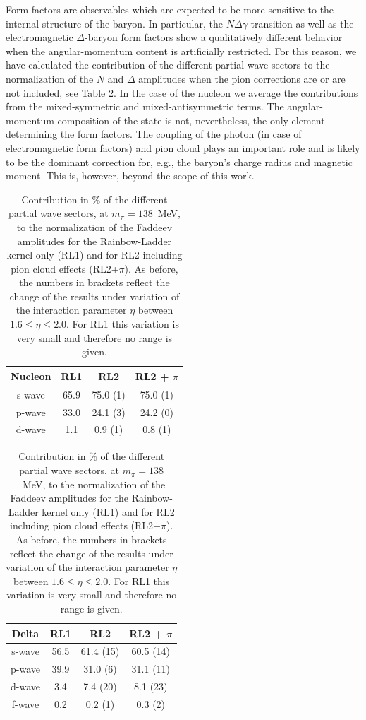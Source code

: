 Form factors are observables which are expected to be more sensitive to the internal structure of the baryon. In particular, the $N\Delta\gamma$ transition \cite{Eichmann:2011aa} as well as the electromagnetic $\Delta$-baryon form factors \cite{Sanchis-Alepuz:2013iia} show a qualitatively different behavior when the angular-momentum content is artificially restricted. For this reason, we have calculated the contribution of the different partial-wave sectors to the normalization of the $N$ and $\Delta$ amplitudes when the pion corrections are or are not included, see Table \ref{tab:PartialWaveContributions}. In the case of the nucleon we average the contributions from the mixed-symmetric and mixed-antisymmetric terms. The angular-momentum composition of the state is not, nevertheless, the only element determining the form factors. The coupling of the photon (in case of electromagnetic form factors) and pion cloud plays an important role and is likely to be the dominant correction for, e.g., the baryon's charge radius and magnetic moment. This is, however, beyond the scope of this work.
\begin{table}[t]
 \begin{center}
 \small
\renewcommand{\arraystretch}{1.2}
  \begin{tabular}[h]{|c||c|c|c|}\hline
Nucleon &  RL1  &  RL2	        &	RL2 + $\pi$   \\ \hline\hline
 s-wave & 65.9  &  75.0 (1)		&	75.0 (1)     \\ \hline
 p-wave & 33.0  &  24.1 (3)		&	24.2 (0)     \\ \hline
 d-wave &  1.1  &   0.9 (1)		&	 0.8 (1)  \\ \hline
\end{tabular}\hspace{1cm}
  \begin{tabular}[h]{|c||c|c|c|}\hline
  Delta &  RL1 &  RL2	&	RL2 + $\pi$ \\ \hline\hline
 s-wave & 56.5 &  61.4 (15)	&	60.5 (14) \\ \hline
 p-wave & 39.9 &  31.0 (6)	&	31.1 (11) \\ \hline
 d-wave & 3.4  &  7.4 (20)	&	 8.1 (23) \\ \hline
 f-wave & 0.2  &  0.2 (1)	&	 0.3 (2) \\ \hline
\end{tabular}
\caption{Contribution in \% of the different partial wave sectors, at $m_{\pi}=138$~MeV, 
to the normalization of the Faddeev amplitudes for the Rainbow-Ladder kernel only (RL1) 
and for RL2 including pion cloud effects (RL2+$\pi$). As before, the numbers in brackets 
reflect the change of the results under variation of the interaction parameter $\eta$ 
between $1.6 \le \eta \le 2.0$. For RL1 this variation is very small and therefore no 
range is given. \label{tab:PartialWaveContributions}}
 \end{center}
\end{table} \\

